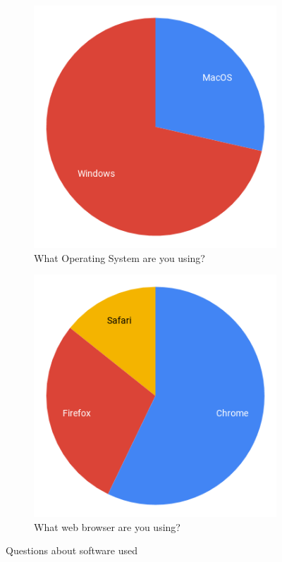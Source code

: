 \documentclass[ %
                    author={Aleena Baig},
                supervisor={Dr Simon Lock},
                    degree={BSc},
                     title={On Making Web Accessible Graphs},
                  subtitle={},
                      year={2019} ]{dissertation}
\begin{document}
\begin{figure}[H]
  \centering
  \begin{subfigure}[c]{0.4\linewidth}
    \centering
    \includegraphics[width=0.75\linewidth]{images/OperatingSystem.png}
     \caption{What Operating System are you using?}
  \end{subfigure}
  \begin{subfigure}[c]{0.4\linewidth}
    \centering
    \includegraphics[width=0.75\linewidth]{images/WebBrowser.png}
    \caption{What web browser are you using?}
  \end{subfigure}
  \caption{Questions about software used}
  \label{fig:backgroundquestions}
\end{figure}
\end{document}
